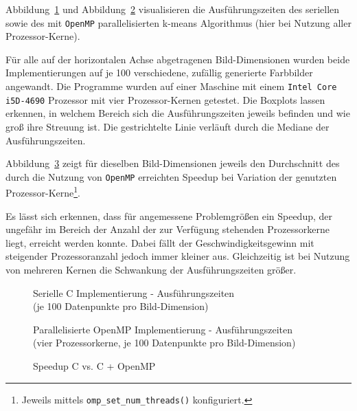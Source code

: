 \documentclass[
    bibliography=totoc, cd=lightcolor, cdmath=false, ngerman]{tudscrreprt}
\begin{document}
Abbildung~\ref{img:cboxplot} und Abbildung~\ref{img:ompboxplot} visualisieren
die Ausführungszeiten des seriellen sowie des mit \texttt{OpenMP}
parallelisierten k-means Algorithmus (hier bei Nutzung aller Prozessor-Kerne).

Für alle auf der horizontalen Achse abgetragenen Bild-Dimensionen wurden beide
Implementierungen auf je 100 verschiedene, zufällig generierte Farbbilder
angewandt. Die Programme wurden auf einer Maschine mit einem \texttt{Intel Core
i5D-4690} Prozessor mit vier Prozessor-Kernen getestet. Die Boxplots lassen
erkennen, in welchem Bereich sich die Ausführungszeiten jeweils befinden und
wie groß ihre Streuung ist. Die gestrichtelte Linie verläuft durch die Mediane
der Ausführungszeiten.

Abbildung~\ref{img:compspeedup} zeigt für dieselben Bild-Dimensionen jeweils
den Durchschnitt des durch die Nutzung von \texttt{OpenMP} erreichten Speedup
bei Variation der genutzten Prozessor-Kerne\footnote{Jeweils mittels
\texttt{omp\_set\_num\_threads()} konfiguriert.}.

Es lässt sich erkennen, dass für angemessene Problemgrößen ein Speedup, der
ungefähr im Bereich der Anzahl der zur Verfügung stehenden Prozessorkerne
liegt, erreicht werden konnte.  Dabei fällt der Geschwindigkeitsgewinn mit
steigender Prozessoranzahl jedoch immer kleiner aus. Gleichzeitig ist bei
Nutzung von mehreren Kernen die Schwankung der Ausführungszeiten größer.

\begin{figure}[htbp]
  \centering
    
  \caption{Serielle C Implementierung - Ausführungszeiten \\
           (je 100 Datenpunkte pro Bild-Dimension)}
  \label{img:cboxplot}
\end{figure}

\begin{figure}[htbp]
  \centering
    
  \caption{Parallelisierte OpenMP Implementierung - Ausführungszeiten \\
           (vier Prozessorkerne, je 100 Datenpunkte pro Bild-Dimension)}
  \label{img:ompboxplot}
\end{figure}

\begin{figure}[htbp]
  \centering
    
  \caption{Speedup C vs. C + OpenMP}
  \label{img:compspeedup}
\end{figure}
\end{document}
